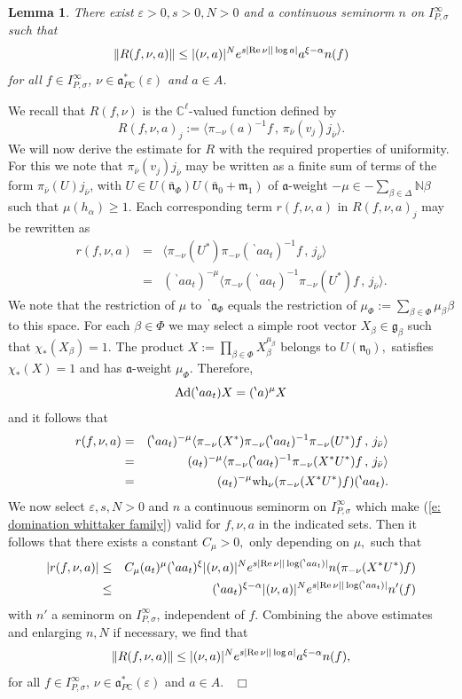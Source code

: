 \documentclass[12pt,a4paper]{article}
\newtheorem{Lemma}[Thm]{Lemma}
\newenvironment{lemma}[0]{\begin{Lemma}\noindent}%
{\end{Lemma}}
\def\proof{\par\noindent{\it Proof.}{\ }{\ }}
\def\qed{~\hfill\hbox{$\Box$}\medbreak}
\def\msy#1{{\mathbb #1}}
\def\C{{\msy C}}
\def\N{{\msy N}}
\def\ga{\alpha}
\def\gb{\beta}
\def\ge{\varepsilon}
\def\gs{\sigma}
\def\gD{\Delta}
\def\got#1{\mathfrak #1}
\def\fa{{\got a}}
\def\fg{{\got g}}
\def\fm{{\got m}}
\def\fn{{\got n}}
\def\Re{{\rm Re}\,}
\def\inp#1#2{\langle#1\,,\,#2\rangle}
\def\Ad{{\rm Ad}}
\def\iC{{\scriptscriptstyle \C}}
\numberwithin{Thm}{section}
\numberwithin{equation}{section}
\def\bfn{\bar\fn}
\def\faPdc{{\fa_{P\iC}^*}}
\numberwithin{equation}{section}
\def\bfn{{\bar \fn}}
\def\bp{\!{\,}^\backprime}
\def\faPdc{\fa_{P\iC}^*}
\def\snorm{n}
\def\IPgs{I_{P,\gs}^\infty}
\def\wh{{\rm wh}}
\def\cchi{\chi}
\def\xxi{\xi}
\begin{document}
\begin{lemma}
\label{l: estimate R}
There exist $\ge >0, s>0, N > 0$ and a continuous seminorm $n$ on $\IPgs$ such that 
\begin{equation}
\label{e: estimate R}
\|R(f,\nu, a)\| \leq |(\nu,a)|^{N} e^{s |\Re \nu| |\log a| } a^{\xxi-\ga} \snorm(f)
\end{equation}
for all $f \in \IPgs$, $\nu \in \faPdc(\ge)$ and 
$a \in A$.
\end{lemma} 
\proof
We recall that $R(f,\nu)$ is the $\C^\ell$-valued function defined by 
$$ 
R(f, \nu, a)_j  := \inp{  \pi_{-\nu}(a)^{-1} f  }{  \pi_{\bar \nu}(v_j) j_{\bar \nu}}.
$$ 
We will now derive the estimate for $R$ with the required properties
of uniformity.
For this we note that $\pi_{\bar \nu}(v_j)  j_{\bar\nu}$ may be written as
a finite sum of terms of the form $\pi_{\bar \nu}(U )j_{\bar\nu}$, 
with $U \in U(\bfn_\Phi)U(\bar \fn_0 + \fm_1)$ of $\fa$-weight $-\mu \in - \sum_{\gb \in \gD} \N \gb$ such that  $\mu(h_\ga) \geq 1.$ Each corresponding term $r(f,\nu,a)$  in $R(f,\nu,a)_j$ 
may be rewritten as 
\begin{eqnarray*} 
r(f,\nu, a) &= & \inp{ \pi_{-\nu}(U^*) \pi_{-\nu}(\bp aa_t)^{-1} f}{j_{\bar \nu}}\\
&=& (\bp a a_t)^{-\mu} \inp{ \pi_{-\nu}(\bp aa_t)^{-1} \pi_{-\nu}(U^*) f}{j_{\bar \nu}}. 
\end{eqnarray*}
We note that the restriction of $\mu$ to ${\bp \fa_\Phi}$ equals the restriction
of $\mu_\Phi := \sum_{\gb\in \Phi} \mu_\gb \gb$ to this space. For each $\gb \in \Phi$ we may 
select a simple root vector $X_\gb \in \fg_{\gb}$ such that $\cchi_*(X_\gb) = 1.$ 
The product $X:= \prod_{\gb\in \Phi} X_\gb^{\mu_\gb}$ belongs to $U(\fn_0),$ 
satisfies $\cchi_*(X) = 1$ and has $\fa$-weight $\mu_\Phi.$ Therefore, 
$$ 
\Ad(\bp a a_t) X = (\bp a)^\mu X
$$ 
and it follows that
\begin{eqnarray*}
r(f,\nu, a)   
&=&  (\bp a a_t)^{-\mu} \inp{ \pi_{-\nu}(X^*) \pi_{-\nu}(\bp aa_t)^{-1} \pi_{-\nu}( U^*) f}{j_{\bar \nu}}\\
&=&   (a_t)^{-\mu}\inp{ \pi_{-\nu}(\bp aa_t)^{-1} \pi_{-\nu}(X^*U^*) f}{j_{\bar \nu}}\\
&=&  (a_t)^{-\mu} \wh_\nu( \pi_{-\nu}(X^*U^*) f)(\bp a a_t).
\end{eqnarray*}
We now select $\ge, s, N >0$ and $n$ a continuous seminorm 
on $\IPgs$ which make (\ref{e: domination whittaker family}) valid for  $f, \nu,a$ 
in the indicated sets.
Then it follows that there exists a constant $C_\mu>0,$ only depending on 
$\mu,$ such that 
\begin{eqnarray*}
|r(f,\nu, a)|
& \leq &
C_\mu (a_t)^\mu (\bp aa_t)^\xxi |(\nu, a)|^N e^{s|\Re \nu||\log (\bp aa_t)|} \snorm(\pi_{-\nu}(X^* U^*) f)\\
 & \leq & 
(\bp a a_t)^{\xxi -\ga} |(\nu,a)|^{N} e^{s|\Re \nu||\log (\bp aa_t)|} \snorm'(f) 
\end{eqnarray*} 
with $\snorm'$ a seminorm on $\IPgs$, independent of $f.$ Combining the above estimates and enlarging $\snorm, N$ if necessary, we find that 
$$ 
\|R(f,\nu, a)\| \leq |(\nu,a)|^{N} e^{s |\Re \nu| |\log a| } a^{\xxi-\ga} \snorm(f),
$$
for all $f \in \IPgs$, $\nu \in \faPdc(\ge)$ and $a \in A$. 
\qed
\end{document}
